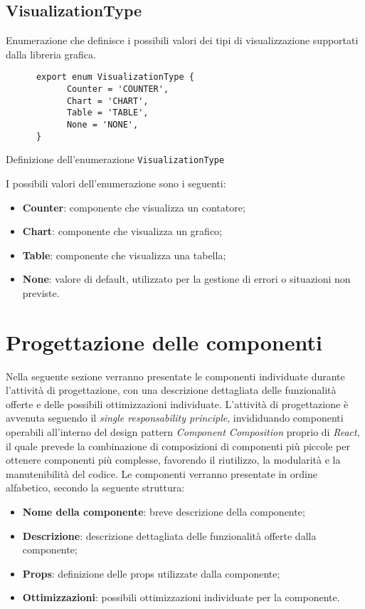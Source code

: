 \subsection{VisualizationType}
Enumerazione che definisce i possibili valori dei tipi di visualizzazione supportati dalla libreria grafica.
\begin{listing}[H]
      \begin{verbatim}
      export enum VisualizationType {
            Counter = 'COUNTER',
            Chart = 'CHART',
            Table = 'TABLE',
            None = 'NONE',
      }
      \end{verbatim}
      \caption{Definizione dell'enumerazione \texttt{VisualizationType}}
      \label{listing:visualizationType}
\end{listing}
I possibili valori dell'enumerazione sono i seguenti:
\begin{itemize}
      \item \textbf{Counter}: componente che visualizza un contatore;
      \item \textbf{Chart}: componente che visualizza un grafico;
      \item \textbf{Table}: componente che visualizza una tabella;
      \item \textbf{None}: valore di default, utilizzato per la gestione di errori o situazioni non previste.
\end{itemize}

\section{Progettazione delle componenti}
Nella seguente sezione verranno presentate le componenti individuate durante l'attività di progettazione, con una descrizione dettagliata delle
funzionalità offerte e delle possibili ottimizzazioni individuate. \newline
L'attività di progettazione è avvenuta seguendo il \textit{single responsability principle}, invididuando componenti operabili all'interno
del design pattern \textit{Component Composition} proprio di \textit{React}, il quale prevede la combinazione di composizioni di componenti più piccole
per ottenere componenti più complesse, favorendo il riutilizzo, la modularità e la manutenibilità del codice. \newline
Le componenti verranno presentate in ordine alfabetico, secondo la seguente struttura:
\begin{itemize}
      \item \textbf{Nome della componente}: breve descrizione della componente;
      \item \textbf{Descrizione}: descrizione dettagliata delle funzionalità offerte dalla componente;
      \item \textbf{Props}: definizione delle props utilizzate dalla componente;
      \item \textbf{Ottimizzazioni}: possibili ottimizzazioni individuate per la componente.
\end{itemize}

